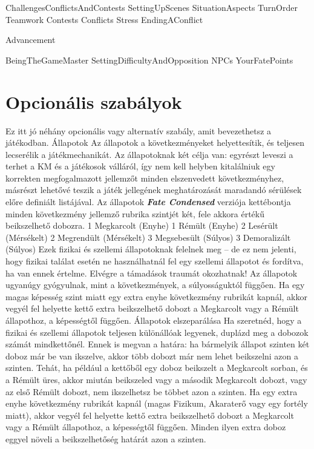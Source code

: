 \documentclass[oneside]{book}
\newcommand{\fate}[1]{\textbf{\textit{#1}}}
\begin{document}
 {ChallengesConflictsAndContests}
 {SettingUpScenes}
 {SituationAspects}
 {TurnOrder}
 {Teamwork}
 {Contests}
 {Conflicts}
 {Stress}
 {EndingAConflict}

 {Advancement}

 {BeingTheGameMaster}
 {SettingDifficultyAndOpposition}
 {NPCs}
 {YourFatePoints}

\chapter{Opcionális szabályok}
Ez itt jó néhány opcionális vagy alternatív szabály, amit bevezethetsz a játékodban.
Állapotok
Az állapotok a következményeket helyettesítik, és teljesen lecserélik a játékmechanikát. Az állapotoknak két célja van: egyrészt leveszi a terhet a KM és a játékosok válláról, így nem kell helyben kitalálniuk egy korrekten megfogalmazott jellemzőt minden elszenvedett következményhez, másrészt lehetővé teszik a játék jellegének meghatározását maradandó sérülések előre definiált listájával.
Az állapotok \fate{Fate Condensed} verziója kettébontja minden következmény jellemző rubrika szintjét két, fele akkora értékű beikszelhető dobozra.
1 Megkarcolt (Enyhe)
1 Rémült (Enyhe)
2 Lesérült (Mérsékelt)
2 Megrendült (Mérsékelt)
3 Megsebesült (Súlyos)
3 Demoralizált (Súlyos)
Ezek fizikai és szellemi állapotoknak felelnek meg – de ez nem jelenti, hogy fizikai találat esetén ne használhatnál fel egy szellemi állapotot és fordítva, ha van ennek értelme. Elvégre a támadások traumát okozhatnak!
Az állapotok ugyanúgy gyógyulnak, mint a következmények, a súlyosságuktól függően.
Ha egy magas képesség szint miatt egy extra enyhe következmény rubrikát kapnál, akkor vegyél fel helyette kettő extra beikszelhető dobozt a Megkarcolt vagy a Rémült állapothoz, a képességtől függően.
Állapotok elszeparálása
Ha szeretnéd, hogy a fizikai és szellemi állapotok teljesen különállóak legyenek, duplázd meg a dobozok számát mindkettőnél. Ennek is megvan a határa: ha bármelyik állapot szinten két doboz már be van ikszelve, akkor több dobozt már nem lehet beikszelni azon a szinten. Tehát, ha például a kettőből egy doboz beikszelt a Megkarcolt sorban, és a Rémült üres, akkor miután beikszeled vagy a második Megkarcolt dobozt, vagy az első Rémült dobozt, nem ikszelhetsz be többet azon a szinten.
Ha egy extra enyhe következmény rubrikát kapnál (magas Fizikum, Akaraterő vagy egy fortély miatt), akkor vegyél fel helyette kettő extra beikszelhető dobozt a Megkarcolt vagy a Rémült állapothoz, a képességtől függően. Minden ilyen extra doboz eggyel növeli a beikszelhetőség határát azon a szinten.
\end{document}
